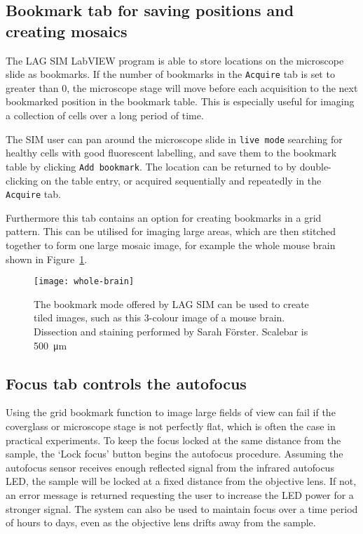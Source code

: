 \subsection{Bookmark tab for saving positions and creating mosaics} \label{sec:lagsimBookmarks}
The LAG SIM LabVIEW program is able to store locations on the microscope slide as bookmarks.
If the number of bookmarks in the \texttt{Acquire} tab is set to greater than 0, the microscope stage will move before each acquisition to the next bookmarked position in the bookmark table. 
This is especially useful for imaging a collection of cells over a long period of time. 

The SIM user can pan around the microscope slide in \texttt{live mode} searching for healthy cells with good fluorescent labelling, and save them to the bookmark table by clicking \texttt{Add bookmark}. 
The location can be returned to by double-clicking on the table entry, or acquired sequentially and repeatedly in the \texttt{Acquire} tab. 

Furthermore this tab contains an option for creating bookmarks in a grid pattern. 
This can be utilised for imaging large areas, which are then stitched together to form one large mosaic image, for example the whole mouse brain shown in Figure~\ref{fig:wholebrain}. 

\begin{figure}[p]
\centering
\texttt{[image: whole-brain]}
\caption[LAG SIM: An image of a full mouse brain can be captured as a mosaic of images]{The bookmark mode offered by LAG SIM can be used to create tiled images, such as this 3-colour image of a mouse brain. Dissection and staining performed by Sarah F{\"o}rster. Scalebar is \SI{500}{\micro\metre}}
\label{fig:wholebrain}
\end{figure}

\subsection{Focus tab controls the autofocus} \label{sec:lagsimFocus}
Using the grid bookmark function to image large fields of view can fail if the coverglass or microscope stage is not perfectly flat, which is often the case in practical experiments. 
To keep the focus locked at the same distance from the sample, the `Lock focus' button begins the autofocus procedure. 
Assuming the autofocus sensor receives enough reflected signal from the infrared autofocus LED, the sample will be locked at a fixed distance from the objective lens. 
If not, an error message is returned requesting the user to increase the LED power for a stronger signal. 
The system can also be used to maintain focus over a time period of hours to days, even as the objective lens drifts away from the sample. 

